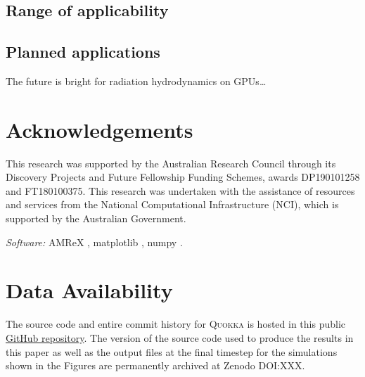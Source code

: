 \documentclass[fleqn,usenatbib]{mnras}
\begin{document}
\subsection{Range of applicability}
\subsection{Planned applications}

The future is bright for radiation hydrodynamics on GPUs\dots

\section*{Acknowledgements}

This research was supported by the Australian Research Council through its Discovery Projects and Future Fellowship Funding Schemes, awards DP190101258 and FT180100375. This research was undertaken with the assistance of resources and services from the National Computational Infrastructure (NCI), which is supported by the Australian Government.

\emph{Software:} AMReX \citep{the_amrex_development_team_2021_5363443},
matplotlib \citep{Hunter:2007},
numpy \citep{harris2020array}.

\section*{Data Availability}
The source code and entire commit history for \textsc{Quokka} is hosted in this public \faGithub\href{https://github.com/BenWibking/quokka-code}{GitHub repository}. The version of the source code used to produce the results in this paper as well as the output files at the final timestep for the simulations shown in the Figures are permanently archived at Zenodo DOI:XXX.







\appendix



\bsp	%
\label{lastpage}
\end{document}
